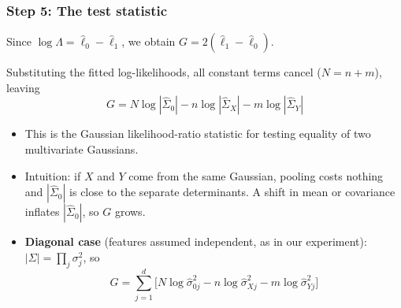 \documentclass{beamer}
\begin{document}
\begin{frame}[t]
\frametitle{Step 5: The test statistic}
Since $\log\Lambda=\hat\ell_0-\hat\ell_1$, we obtain $G=2(\hat\ell_1-\hat\ell_0)$.

\vspace{0.3em}
Substituting the fitted log-likelihoods, all constant terms cancel ($N=n+m$), leaving
\[
\boxed{G=N\log|\hat\Sigma_0|-n\log|\hat\Sigma_X|-m\log|\hat\Sigma_Y|}
\]
\begin{itemize}
    \item This is the Gaussian likelihood-ratio statistic for testing equality of two multivariate Gaussians.
    \vspace{0.3em}
    \item Intuition: if $X$ and $Y$ come from the same Gaussian, pooling costs nothing and $|\hat\Sigma_0|$ is close to the separate determinants. A shift in mean or covariance inflates $|\hat\Sigma_0|$, so $G$ grows.
    \vspace{0.3em}
    \item \textbf{Diagonal case} (features assumed independent, as in our experiment): $|\Sigma|=\prod_j\sigma_j^2$, so
\[
G=\sum_{j=1}^{d}\Big[N\log\hat\sigma^2_{0j}-n\log\hat\sigma^2_{Xj}-m\log\hat\sigma^2_{Yj}\Big]
\]
\end{itemize}
\end{frame}
\end{document}
